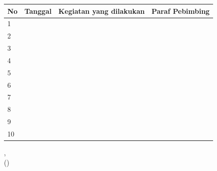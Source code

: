 \begin{center}
    \begin{tabularx}{\textwidth}{|p{7mm}|p{6em}|X|p{6em}|}
        \hline
        \rule{0pt}{3ex} No & Tanggal & Kegiatan yang dilakukan & Paraf Pebimbing \\
        \hline
        \rule{0pt}{3ex} 1 &&&  \\
        \hline
        \rule{0pt}{3ex} 2 &&&  \\
        \hline
        \rule{0pt}{3ex} 3 &&&  \\
        \hline
        \rule{0pt}{3ex} 4 &&&  \\
        \hline
        \rule{0pt}{3ex} 5 &&&  \\
        \hline
        \rule{0pt}{3ex} 6 &&&  \\
        \hline
        \rule{0pt}{3ex} 7 &&&  \\
        \hline
        \rule{0pt}{3ex} 8 &&&  \\
        \hline
        \rule{0pt}{3ex} 9 &&&  \\
        \hline
        \rule{0pt}{3ex} 10 &&&  \\
        \hline
    \end{tabularx}
\end{center}

\vspace{\baselineskip}

\begin{flushleft}
    {\kota}, \textbf{\tglpernyataan}\\[3cm]
    ({\pembimbinglapangan})
\end{flushleft}
